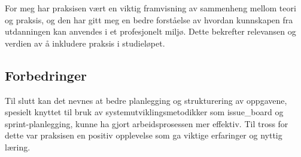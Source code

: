 For meg har praksisen vært en viktig framvisning av sammenheng mellom teori og praksis, og den har gitt meg en bedre forståelse av hvordan kunnskapen fra utdanningen kan anvendes i et profesjonelt miljø. Dette bekrefter relevansen og verdien av å inkludere praksis i studieløpet.

\subsection{Forbedringer}

Til slutt kan det nevnes at bedre planlegging og strukturering av oppgavene, spesielt knyttet til bruk av systemutviklingsmetodikker som \gls{issue_board} og \gls{sprint}-planlegging, kunne ha gjort arbeidsprosessen mer effektiv. Til tross for dette var praksisen en positiv opplevelse som ga viktige erfaringer og nyttig læring.